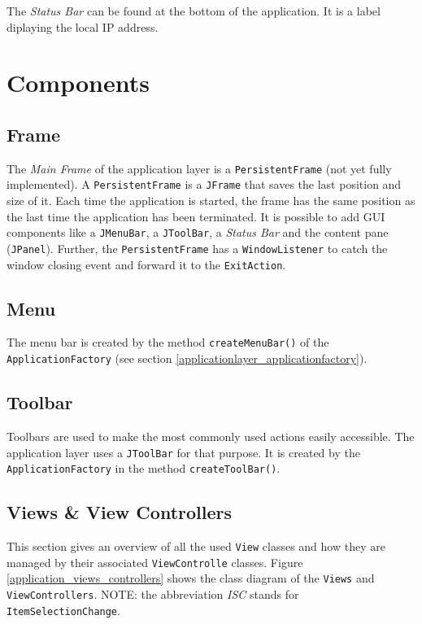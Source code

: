 The \emph{Status Bar} can be found at the bottom of the application. It is a label diplaying the local IP address.

\section{Components}
\label{applicationlayer_component_desc}

\subsection{Frame}
\label{applicationlayer_frame_desc}
The \emph{Main Frame} of the application layer is a \texttt{Persistent\-Frame} (not yet fully implemented). A \texttt{Persistent\-Frame} is a \texttt{JFrame} that saves the last position and size of it. Each time the application is started, the frame has the same position as the last time the application has been terminated. It is possible to add GUI components like a \texttt{JMenu\-Bar}, a \texttt{JTool\-Bar}, a \emph{Status Bar} and the content pane (\texttt{JPanel}). Further, the \texttt{Persistent\-Frame} has a \texttt{Window\-Listener} to catch the window closing event and forward it to the \texttt{Exit\-Action}.

\subsection{Menu}
The menu bar is created by the method \texttt{createMenuBar()} of the \texttt{Application\-Factory} (see section \ref{applicationlayer_applicationfactory}).

\subsection{Toolbar}
Toolbars are used to make the most commonly used actions easily accessible. The application layer uses a \texttt{JTool\-Bar} for that purpose. It is created by the \texttt{Application\-Factory} in the method \texttt{create\-Tool\-Bar()}.

\subsection{Views \& View Controllers}
This section gives an overview of all the used \texttt{View} classes and how they are managed by their associated \texttt{View\-Controlle} classes. Figure \ref{application_views_controllers} shows the class diagram of the \texttt{Views} and \texttt{ViewControllers}. NOTE: the abbreviation \emph{ISC} stands for \texttt{Item\-Selection\-Change}.

